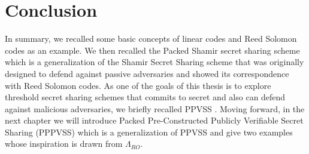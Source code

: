 \section{Conclusion}
In summary, we recalled some basic concepts of linear codes and Reed Solomon codes as an example. We then 
recalled the Packed Shamir secret sharing scheme which is a generalization of the Shamir Secret Sharing scheme \cite{10.1145/359168.359176} 
that was originally designed to defend against passive adversaries and showed its correspondence with 
Reed Solomon codes. As one of the goals of this thesis is to explore threshold secret sharing schemes that commits to 
secret and also 
can defend against malicious adversaries, we briefly recalled PPVSS \cite{cryptoeprint:2025/576}. 
Moving forward, in the next chapter we will introduce 
Packed Pre-Constructed Publicly Verifiable Secret Sharing (PPPVSS) which is a generalization of 
PPVSS and give two examples whose inspiration is drawn from $\Lambda_{RO}$.

